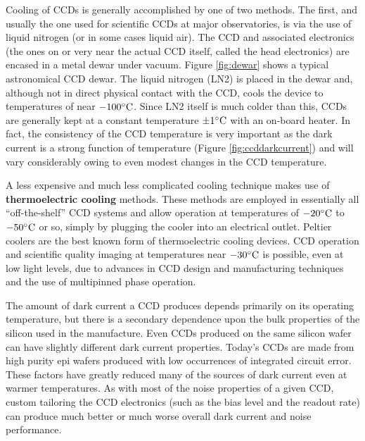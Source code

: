 \documentclass[a4paper,10pt]{article}
\begin{document}
{\noindent}Cooling of CCDs is generally accomplished by one of two methods. The first, and usually the one used for scientific CCDs at major observatories, is via the use of liquid nitrogen (or in some cases liquid air). The CCD and associated electronics (the ones on or very near the actual CCD itself, called the head electronics) are encased in a metal dewar under vacuum. Figure \ref{fig:dewar} shows a typical astronomical CCD dewar. The liquid nitrogen (LN2) is placed in the dewar and, although not in direct physical contact with the CCD, cools the device to temperatures of near $-100^\circ{\rm C}$. Since LN2 itself is much colder than this, CCDs are generally kept at a constant temperature $\pm1^\circ{\rm C}$ with an on-board heater. In fact, the consistency of the CCD temperature is very important as the dark current is a strong function of temperature (Figure \ref{fig:ccddarkcurrent}) and will vary considerably owing to even modest changes in the CCD temperature.

{\noindent}A less expensive and much less complicated cooling technique makes use of \textbf{thermoelectric cooling} methods. These methods are employed in essentially all ``off-the-shelf'' CCD systems and allow operation at temperatures of $-20^\circ{\rm C}$ to $-50^\circ{\rm C}$ or so, simply by plugging the cooler into an electrical outlet. Peltier coolers are the best known form of thermoelectric cooling devices. CCD operation and scientific quality imaging at temperatures near $-30^\circ{\rm C}$ is possible, even at low light levels, due to advances in CCD design and manufacturing techniques and the use of multipinned phase operation.

{\noindent}The amount of dark current a CCD produces depends primarily on its operating temperature, but there is a secondary dependence upon the bulk properties of the silicon used in the manufacture. Even CCDs produced on the same silicon wafer can have slightly different dark current properties. Today's CCDs are made from high purity epi wafers produced with low occurrences of integrated circuit error. These factors have greatly reduced many of the sources of dark current even at warmer temperatures. As with most of the noise properties of a given CCD, custom tailoring the CCD electronics (such as the bias level and the readout rate) can produce much better or much worse overall dark current and noise performance.

\end{document}

